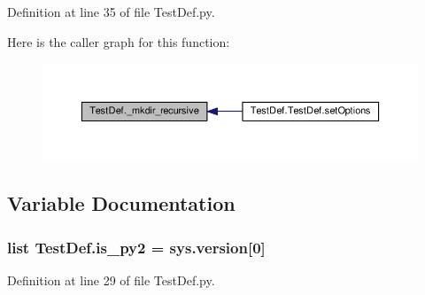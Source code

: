 Definition at line 35 of file Test\-Def.\-py.



Here is the caller graph for this function\-:
\nopagebreak
\begin{figure}[H]
\begin{center}
\leavevmode
\includegraphics[width=350pt]{namespaceTestDef_a0f44619ec0fe932324e50d8cf706d647_icgraph}
\end{center}
\end{figure}




\subsection{Variable Documentation}
\hypertarget{namespaceTestDef_a4e87724b7a6a117c2cca22c557936868}{
\subsubsection[{is\-\_\-py2}]{\setlength{\rightskip}{0pt plus 5cm}list Test\-Def.\-is\-\_\-py2 = sys.\-version\mbox{[}0\mbox{]}}}\label{namespaceTestDef_a4e87724b7a6a117c2cca22c557936868}


Definition at line 29 of file Test\-Def.\-py.

